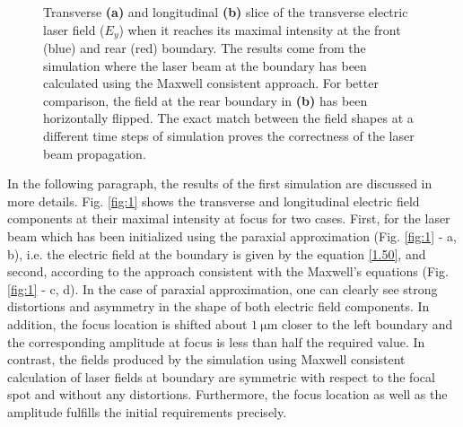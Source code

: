 \begin{figure}[h!]
	\centering
	\hspace{1mm}
	\caption{Transverse \textbf{(a)} and longitudinal \textbf{(b)} slice of the transverse electric laser field ($ E_{y} $) when it reaches its maximal intensity at the front (blue) and rear (red) boundary. The results come from the simulation where the laser beam at the boundary has been calculated using the Maxwell consistent approach. For better comparison, the field at the rear boundary in \textbf{(b)} has been horizontally flipped. The exact match between the field shapes at a different time steps of simulation proves the correctness of the laser beam propagation.}
	\label{fig:4}
\end{figure}

In the following paragraph, the results of the first simulation are discussed in more details. Fig. \ref{fig:1} shows the transverse and longitudinal electric field components at their maximal intensity at focus for two cases. First, for the laser beam which has been initialized using the paraxial approximation (Fig. \ref{fig:1} - a, b), i.e. the electric field at the boundary is given by the equation \ref{1.50}, and second, according to the approach consistent with the Maxwell's equations (Fig. \ref{fig:1} - c, d). In the case of paraxial approximation, one can clearly see strong distortions and asymmetry in the shape of both electric field components. In addition, the focus location is shifted about $ 1 \: \mathrm{\mu m} $ closer to the left boundary and the corresponding amplitude at focus is less than half the required value. In contrast, the fields produced by the simulation using Maxwell consistent calculation of laser fields at boundary are symmetric with respect to the focal spot and without any distortions. Furthermore, the focus location as well as the amplitude fulfills the initial requirements precisely.

